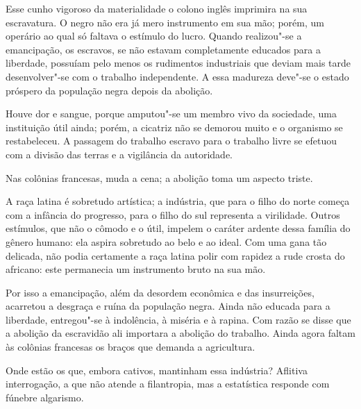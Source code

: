 \begin{linenumbers}
Esse cunho vigoroso da materialidade o colono inglês imprimira na sua
escravatura. O negro não era já mero instrumento em sua mão; porém, um
operário ao qual só faltava o estímulo do lucro. Quando realizou"-se a
emancipação, os escravos, se não estavam completamente educados para a
liberdade, possuíam pelo menos os rudimentos industriais que deviam
mais tarde desenvolver"-se com o trabalho independente. A essa
madureza deve"-se o estado próspero da população negra depois da abolição.

Houve dor e sangue, porque amputou"-se um membro vivo da sociedade, uma
instituição útil ainda; porém, a cicatriz não se demorou muito e o
organismo se restabeleceu. A passagem do trabalho escravo para o
trabalho livre se efetuou com a divisão das terras e a vigilância da autoridade. 

Nas colônias francesas, muda a cena; a abolição toma um aspecto triste.

A raça latina é sobretudo artística; a indústria, que para o filho do
norte começa com a infância do progresso, para o filho do sul
representa a virilidade. Outros estímulos, que não o cômodo e o útil,
impelem o caráter ardente dessa família do gênero humano: ela aspira
sobretudo ao belo e ao ideal. Com uma gana tão delicada, não podia
certamente a raça latina polir com rapidez a rude crosta do africano:
este permanecia um instrumento bruto na sua mão. 

Por isso a emancipação, além da desordem econômica e das insurreições,
acarretou a desgraça e ruína da população negra. Ainda não educada para
a liberdade, entregou"-se à indolência, à miséria e à rapina. Com
razão se disse que a abolição da escravidão ali importara a abolição do
trabalho. Ainda agora faltam às colônias francesas os braços que
demanda a agricultura.

Onde estão os que, embora cativos, mantinham essa indústria? Aflitiva
interrogação, a que não atende a filantropia, mas a estatística
responde com fúnebre algarismo. 

\end{linenumbers}

\sectionitem

